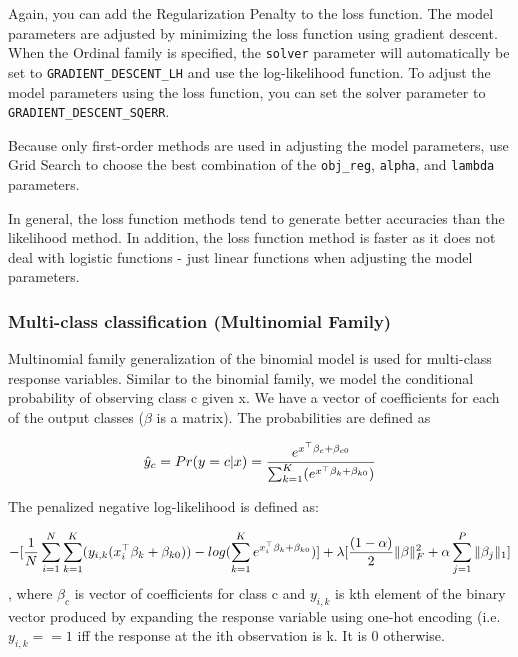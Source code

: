 Again, you can add the Regularization Penalty to the loss function. The model parameters are adjusted by minimizing the loss function using gradient descent. When the Ordinal family is specified, the \texttt{solver} parameter will automatically be set to \texttt{GRADIENT\_DESCENT\_LH} and use the log-likelihood function. To adjust the model parameters using the loss function, you can set the solver parameter to \texttt{GRADIENT\_DESCENT\_SQERR}. 

Because only first-order methods are used in adjusting the model parameters, use Grid Search to choose the best combination of the \texttt{obj\_reg}, \texttt{alpha}, and \texttt{lambda} parameters.

In general, the loss function methods tend to generate better accuracies than the likelihood method. In addition, the loss function method is faster as it does not deal with logistic functions - just linear functions when adjusting the model parameters.

\waterExampleInR


\waterExampleInPython


\subsubsection{Multi-class classification (Multinomial Family)}
Multinomial family generalization of the binomial model is used for multi-class response variables. Similar to the
binomial family, we model the conditional probability of observing class c given x. We have a vector of coefficients
for each of the output classes ($\beta$ is a matrix). The probabilities are defined as

$$ \hat{y}_c = Pr(y = c|x) = {e^{x^{\top}\beta_c + \beta_{c0}} \over \sum_{k=1}^K (e^{x^{\top}\beta_k + \beta_{k0}}) }$$ 

The penalized negative log-likelihood is defined as:

$$
- \lbrack {1\over{N}} \sum_{i=1}^N\sum_{k=1}^K(y_{i,k}(x_i^{\top}\beta_k + \beta_{k0})) - log(\sum_{k=1}^Ke^{x_i^{\top}\beta_k + \beta_{k0}}) \rbrack + \lambda \lbrack {(1-\alpha) \over 2} \| \beta \|_F^2 + \alpha\sum_{j=1}^P \|\beta_j\|_1 \rbrack 
$$
, where $\beta_c$ is vector of coefficients for class c and $y_{i,k}$ is kth element of the binary vector produced by
expanding the response variable using one-hot encoding (i.e. $y_{i,k} == 1$ iff the response at the ith observation
is k. It is 0 otherwise.

